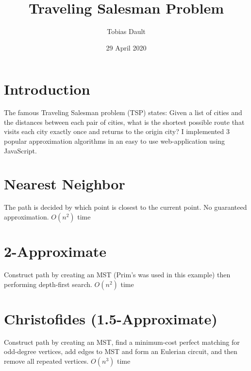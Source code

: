 \documentclass[11pt]{article}
\title{\textbf{Traveling Salesman Problem}}
\author{Tobias Dault}
\date{29 April 2020}
\begin{document}
\maketitle
\thispagestyle{empty}

\section{Introduction}
The famous Traveling Salesman problem (TSP) states: Given a list of cities and the distances between each pair of cities, what is the shortest possible route that visits each city exactly once and returns to the origin city? I implemented 3 popular approximation algorithms in an easy to use web-application using JavaScript.

\section{Nearest Neighbor}
The path is decided by which point is closest to the current point. No guaranteed approximation. $O(n^2)$ time



\section{2-Approximate}
Construct path by creating an MST (Prim's was used in this example) then performing depth-first search. $O(n^2)$ time

\section{Christofides (1.5-Approximate)}
Construct path by creating an MST, find a minimum-cost perfect matching for odd-degree vertices, add edges to MST and form an Eulerian circuit, and then remove all repeated vertices. $O(n^3)$ time
\end{document}
